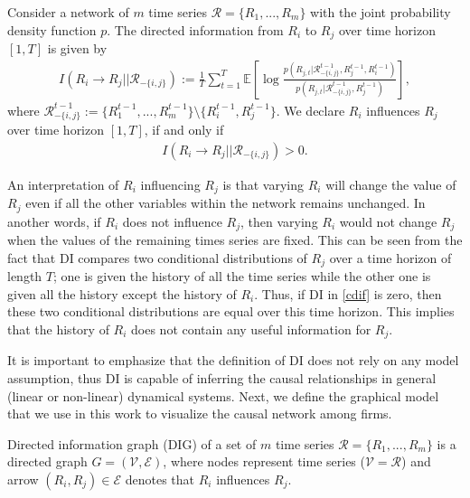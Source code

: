  \begin{definition}\label{cdi}
Consider a network of $m$ time series $\mathcal{R}=\{R_1,...,R_m\}$ with the joint probability density function $p$. The directed information from $R_i$ to $R_j$ over time horizon $[1,T]$ is given by
\begin{align}\label{cdif}
I(R_i\rightarrow R_j||\mathcal{R}_{-\{i,j\}}):=\frac{1}{T}\sum_{t=1}^T\mathbb{E}\left[\log\frac{p(R_{j,t}|\mathcal{R}^{t-1}_{-\{i,j\}},R_{j}^{t-1},R_{i}^{t-1})}{p(R_{j,t}|\mathcal{R}^{t-1}_{-\{i,j\}},R_{j}^{t-1})}\right],
\end{align}
where $\mathcal{R}_{-\{i,j\}}^{t-1}\!:=\!\{R_{1}^{t-1},...,R_{m}^{t-1}\}\!\setminus\!\{R_{i}^{t-1},R_{j}^{t-1}\}$.
We declare $R_i$ influences $R_j$ over time horizon $[1,T]$, if and only if
\begin{align}\label{cdif1}
I(R_i\rightarrow R_j||\mathcal{R}_{-\{i,j\}})>0.
\end{align}
 \end{definition}
 
 An interpretation of $R_i$ influencing $R_j$ is that varying $R_i$ will change the value of $R_j$ even if all the other variables within the network remains unchanged. 
 In another words, if $R_i$ does not influence $R_j$, then varying $R_i$ would not change $R_j$ when the values of the remaining times series are fixed. 
 This can be seen from the fact that DI compares two conditional distributions of $R_j$ over a time horizon of length $T$; one is given the history of all the time series while the other one is given all the history except the history of $R_i$. Thus, if DI in \eqref{cdif} is zero, then these two conditional distributions are equal over this time horizon. This implies that the history of $R_i$ does not contain any useful information for $R_j$.  
 
 
It is important to emphasize that the definition of DI does not rely on any model assumption, thus DI is capable of inferring the causal relationships in general (linear or non-linear) dynamical systems. Next, we define the graphical model that we use in this work to visualize the causal network among firms.


\begin{definition}\label{DIG1}
Directed information graph (DIG) of a set of $m$ time series $\mathcal{R}=\{R_1,...,R_m\}$ is a directed graph $G=(\mathcal{V},\mathcal{E})$, where nodes represent time series ($\mathcal{V}=\mathcal{R}$) and arrow $(R_i,R_j)\in \mathcal{E}$ denotes that $R_i$ influences $R_j$. 
\end{definition} 

